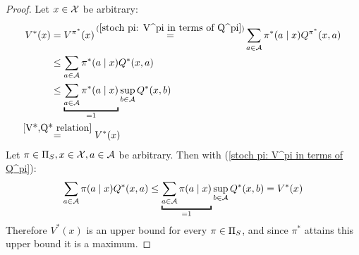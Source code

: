 \begin{proof}
	\xToy{\ref{ii:1}}{\ref{ii:2}} Let \(x\in\mathcal{X}\) be arbitrary: 
	\begin{align*}
		V^*(x)&=V^{\pi^*}(x)\xeq{(\ref{stoch pi: V^pi in terms of Q^pi})}
		\sum_{a\in\cA}\pi^*(a\mid x) Q^{\pi^*}(x,a) \nonumber\\
		&\le \sum_{a\in\cA}\pi^*(a\mid x) Q^*(x,a)\\
		&\le \underbracket{\sum_{a\in\cA}\pi^*(a\mid x)}_{=1} 
		\sup_{b\in\cA}Q^*(x,b) \nonumber\\
		&\lxeq{\ref{V*,Q* relation}}V^*(x) \nonumber
	\end{align*}
	\xToy{\ref{ii:2}}{\ref{ii:3}} Let \(\pi\in\Pi_S, x\in\mathcal{X}, a\in\mathcal{A}\) be arbitrary. Then with (\ref{stoch pi: V^pi in terms of Q^pi}):
	\[
		\sum_{a\in\cA}\pi(a\mid x) Q^*(x,a)
		\le \underbracket{\sum_{a\in\cA}\pi(a\mid x)}_{=1}
		\sup_{b\in\cA}Q^*(x,b)=V^*(x)
	\]
	Therefore \(V^* (x)\) is an upper bound for every \(\pi\in\Pi_S\), and since \(\pi^*\) attains this upper bound it is a maximum.


\end{proof}
